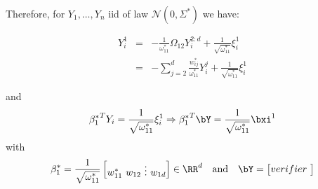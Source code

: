 Therefore, for $Y_1,\dots,Y_n$ iid of law $\mathcal N(0,\Sigma^*)$ we have:

\begin{equation}
\begin{array}{lcl}
  Y_i^1&=&-\frac{1}{\omega_{11}^*}\Omega_{12}Y_i^{2:d}+\frac{1}{\sqrt{\omega_{11}^*}}\xi^1_i\\
  &=&-\sum_{j=2}^{d}\frac{w_{ij}^*}{\omega_{11}^*}Y_i^j+\frac{1}{\sqrt{\omega_{11}^*}}\xi^1_i
\end{array}
\end{equation}

and
\begin{equation}
{\beta_1^*}^TY_i=\frac{1}{\sqrt{\omega_{11}^*}}\xi^1_i
\Rightarrow
{\beta_1^*}^T\bY=\frac{1}{\sqrt{\omega_{11}^*}}\bxi^1
\end{equation}
with
\begin{equation}
\beta_1^*=\frac{1}{\sqrt{\omega_{11}^*}}
  \begin{bmatrix}
  w_{11}^*\
  w_{12}\
  \vdots\
  w_{1d}
  \end{bmatrix}
  \in \RR^d
  \quad \text{and}\quad \bY= \begin{bmatrix}
  verifier\
  \end{bmatrix}
\end{equation}
